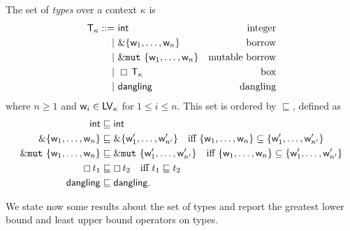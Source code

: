 \begin{definition}[Types]
  The set of \emph{types} over a context $\kappa$ is
  \begin{align*}
    \mathsf{T}_\kappa ::=&\ \mathsf{int} & \text{integer}\\
    | &\ \&\{\mathsf{w}_1,\ldots,\mathsf{w}_n\} & \text{borrow}\\
    | &\ \&\mathtt{mut}\ \{\mathsf{w}_1,\ldots,\mathsf{w}_n\} & \text{mutable borrow}\\
    | &\ \boxempty\,{\mathsf{T}_\kappa} & \text{box}\\
    | &\ \mathsf{dangling} & \text{dangling}
  \end{align*}
  where $n\ge 1$ and $\mathsf{w}_i\in\mathsf{LV}_\kappa$ for $1\le i\le n$.
  This set is ordered by $\sqsubseteq$, defined as
  \begin{align*}
    \mathsf{int}&\sqsubseteq\mathsf{int}\\
    \&\{\mathsf{w}_1,\ldots,\mathsf{w}_n\} & \sqsubseteq
    \&\{\mathsf{w}'_1,\ldots,\mathsf{w}'_{n'}\} \quad\text{iff $\{\mathsf{w}_1,\ldots,\mathsf{w}_n\}\subseteq\{\mathsf{w}'_1,\ldots,\mathsf{w}'_{n'}\}$}\\
    \&\mathtt{mut}\ \{\mathsf{w}_1,\ldots,\mathsf{w}_n\} & \sqsubseteq
    \&\mathtt{mut}\ \{\mathsf{w}'_1,\ldots,\mathsf{w}'_{n'}\} \quad\text{iff $\{\mathsf{w}_1,\ldots,\mathsf{w}_n\}\subseteq\{\mathsf{w}'_1,\ldots,\mathsf{w}'_{n'}\}$}\\
    \boxempty\,{t_1}&\sqsubseteq\boxempty\,{t_2} \quad\text{iff $t_1\sqsubseteq t_2$}\\
    \mathsf{dangling}&\sqsubseteq\mathsf{dangling.}
  \end{align*}
\end{definition}

We state now some results about the set of types and report
the greatest lower bound and least upper bound operators on types.

